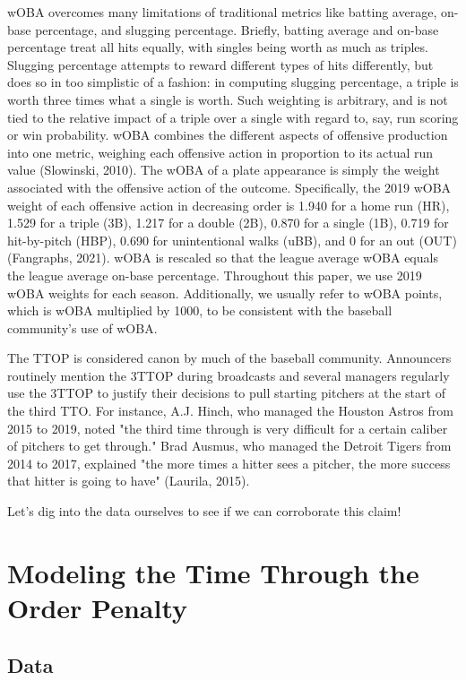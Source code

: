 \documentclass[twoside]{article}
\theoremstyle{definition}
\begin{document}
wOBA overcomes many limitations of traditional metrics like batting average, on-base percentage, and slugging percentage. Briefly, batting average and on-base percentage treat all hits equally, with singles being worth as much as triples. Slugging percentage attempts to reward different types of hits differently, but does so in too simplistic of a fashion: in computing slugging percentage, a triple is worth three times what a single is worth. Such weighting is arbitrary, and is not tied to the relative impact of a triple over a single with regard to, say, run scoring or win probability. wOBA combines the different aspects of offensive production into one metric, weighing each offensive action in proportion to its actual run value (Slowinski, 2010). The wOBA of a plate appearance is simply the weight associated with the offensive action of the outcome. Specifically, the 2019 wOBA weight of each offensive action in decreasing order is 1.940 for a home run (HR), 1.529 for a triple (3B), 1.217 for a double
(2B), 0.870 for a single (1B), 0.719 for hit-by-pitch (HBP), 0.690 for unintentional walks (uBB), and 0 for an out (OUT) (Fangraphs, 2021). wOBA is rescaled so that the league average wOBA equals the league average on-base percentage. Throughout this paper, we use 2019 wOBA weights for each season. Additionally, we usually refer to wOBA points, which is wOBA multiplied by 1000, to be consistent with the baseball community's use of wOBA.

The TTOP is considered canon by much of the baseball community. Announcers routinely mention the 3TTOP during broadcasts and several managers regularly use the 3TTOP to justify their decisions to pull starting pitchers at the start of the third TTO. For instance, A.J. Hinch, who managed the Houston Astros from 2015 to 2019, noted "the third time through is very difficult for a certain caliber of pitchers to get through." Brad Ausmus, who managed the Detroit Tigers from 2014 to 2017, explained "the more times a hitter sees a pitcher, the more success that hitter is going to have" (Laurila, 2015).

Let's dig into the data ourselves to see if we can corroborate this claim!

\section{Modeling the Time Through the Order Penalty}

\subsection{Data}
\end{document}
